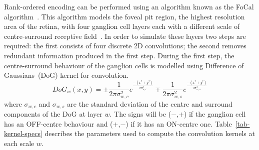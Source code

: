 Rank-ordered encoding can be performed using an algorithm known as the
{FoCal algorithm~\cite{sen2009evaluating}}.
This algorithm models the foveal pit region, the highest resolution area of the retina, with four ganglion cell layers each with a different scale of centre-surround receptive field~\cite{kolb2003retina}. In order to simulate these layers two steps are required: the first consists of four discrete 2D convolutions; the second removes redundant information produced in the first step. During the first step, the centre-surround behaviour of the ganglion cells is modelled using Difference of Gaussians~(DoG) kernel for convolution. 
\begin{equation}
\label{eq-dog}
DoG_w(x,y) = \pm\frac{1}{2\pi\sigma_{w,c}^2}e^{\frac{-(x^2 + y^2)}{2\sigma_{w,c}^2}}
\mp\frac{1}{2\pi\sigma_{w,s}^2}e^{\frac{-(x^2 + y^2)}{2\sigma_{w,s}^2}}
\end{equation}
where $\sigma_{w,c}$ and $\sigma_{w,s}$ are the standard deviation of the 
centre and surround components of the DoG at layer $w$. The signs 
will be ($-$,$+$) if the ganglion cell has an OFF-centre behaviour and 
($+$,$-$) if it has an ON-centre one. Table~\ref{tab-kernel-specs} 
describes the parameters used to compute the convolution kernels at each 
scale $w$.

